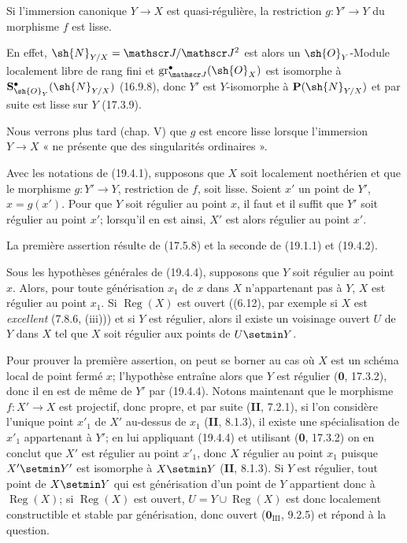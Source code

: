\begin{corollary}[19.4.3]
\label{IV.19.4.3}
Si l'immersion canonique $Y\to X$ est quasi-régulière, la restriction $g:Y'\to Y$ du morphisme $f$ est lisse.
\end{corollary}

En effet, $\sh{N}_{Y/X}=\mathscr J/\mathscr J^2$ est alors un $\sh{O}_Y$-Module localement libre de rang fini et $\operatorname{gr}_{\mathscr J}^\bullet(\sh{O}_X)$ est isomorphe à $\mathbf S_{\sh{O}_Y}^\bullet(\sh{N}_{Y/X})$ (16.9.8), donc $Y'$ est $Y$-isomorphe à $\mathbf P(\sh{N}_{Y/X})$ et par suite est lisse sur $Y$ (17.3.9).

Nous verrons plus tard (chap. V) que $g$ est encore lisse lorsque l'immersion $Y\to X$ « ne présente que des singularités ordinaires ».

\begin{proposition}[19.4.4]
\label{IV.19.4.4}
Avec les notations de \textup{(19.4.1)}, supposons que $X$ soit localement noethérien et que le morphisme $g:Y'\to Y$, restriction de $f$, soit lisse. Soient $x'$ un point de $Y'$, $x=g(x')$. Pour que $Y$ soit régulier au point $x$, il faut et il suffit que $Y'$ soit régulier au point $x'$; lorsqu'il en est ainsi, $X'$ est alors régulier au point $x'$.
\end{proposition}

La première assertion résulte de (17.5.8) et la seconde de (19.1.1) et (19.4.2).

\begin{corollary}[19.4.5]
\label{IV.19.4.5}
Sous les hypothèses générales de \textup{(19.4.4)}, supposons que $Y$ soit régulier au point $x$. Alors, pour toute générisation $x_1$ de $x$ dans $X$ n'appartenant pas à $Y$, $X$ est régulier au point $x_1$. Si $\operatorname{Reg}(X)$ est ouvert \textup{((6.12), par exemple si $X$ est \emph{excellent} (7.8.6, (iii)))}
et si $Y$ est régulier, alors il existe un voisinage ouvert $U$ de $Y$ dans $X$ tel que $X$ soit régulier aux points de $U\setmin Y$.
\end{corollary}

Pour prouver la première assertion, on peut se borner au cas où $X$ est un schéma local de point fermé $x$; l'hypothèse entraîne alors que $Y$ est régulier (\textbf{0}, 17.3.2), donc il en est de même de $Y'$ par (19.4.4). Notons maintenant que le morphisme $f:X'\to X$ est projectif, donc propre, et par suite (\textbf{II}, 7.2.1), si l'on considère l'unique point $x'_1$ de $X'$ au-dessus de $x_1$ (\textbf{II}, 8.1.3), il existe une spécialisation de $x'_1$ appartenant à $Y'$; en lui appliquant (19.4.4) et utilisant (\textbf{0}, 17.3.2) on en conclut que $X'$ est régulier au point $x'_1$, donc $X$ régulier au point $x_1$ puisque $X'\setmin Y'$ est isomorphe à $X\setmin Y$ (\textbf{II}, 8.1.3). Si $Y$ est régulier, tout point de $X\setmin Y$ qui est générisation d'un point de $Y$ appartient donc à $\operatorname{Reg}(X)$; si $\operatorname{Reg}(X)$ est ouvert, $U=Y\cup\operatorname{Reg}(X)$ est donc localement constructible et stable par générisation, donc ouvert ($\mathbf{0}_{\mathrm{III}}$, 9.2.5) et répond à la question.

